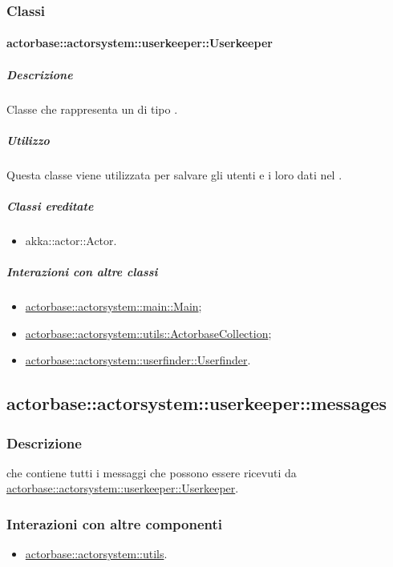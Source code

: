 \documentclass{scalatekids-article}
\begin{document}
\subsubsection{Classi}

\paragraph{actorbase::actorsystem::userkeeper::Userkeeper}
\label{sec:actorbase::actorsystem::userkeeper::Userkeeper}

\subparagraph{Descrizione}
Classe che rappresenta un  di tipo .

\subparagraph{Utilizzo}
Questa classe viene utilizzata per salvare gli utenti e i loro dati nel .

\subparagraph{Classi ereditate}
\begin{itemize}
\item akka::actor::Actor.
\end{itemize}

\subparagraph{Interazioni con altre classi}
\begin{itemize}
\item \hyperref[sec:actorbase::actorsystem::main::Main]{actorbase::actorsystem::main::Main};
\item \hyperref[sec:actorbase::actorsystem::utils::ActorbaseCollection]{actorbase::actorsystem::utils::ActorbaseCollection};
\item \hyperref[sec:actorbase::actorsystem::userfinder::Userfinder]{actorbase::actorsystem::userfinder::Userfinder}.
\end{itemize}

\subsection{actorbase::actorsystem::userkeeper::messages}
\label{sec:actorbase::actorsystem::userkeeper::messages}

\subsubsection{Descrizione}

 che contiene tutti i messaggi che possono essere ricevuti da
\hyperref[sec:actorbase::actorsystem::userkeeper::Userkeeper]{actorbase::actorsystem::userkeeper::Userkeeper}.

\subsubsection{Interazioni con altre componenti}
\begin{itemize}
\item \hyperref[sec:actorbase::actorsystem::utils]{actorbase::actorsystem::utils}.
\end{itemize}
\end{document}
